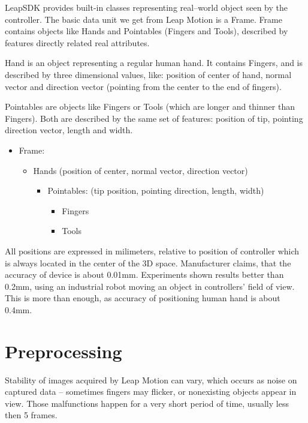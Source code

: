 LeapSDK provides built-in classes representing real--world object seen by the controller. The basic data unit we get from Leap Motion is a Frame. Frame contains objects like Hands and Pointables (Fingers and Tools), described by features directly related real attributes.

Hand is an object representing a regular human hand. It contains Fingers, and is described by three dimensional values, like: position of center of hand, normal vector and direction vector (pointing from the center to the end of fingers). 

Pointables are objects like Fingers or Tools (which are longer and thinner than Fingers). Both are described by the same set of features: position of tip, pointing direction vector, length and width.

\begin{itemize}
	\item Frame:
	\begin{itemize}
		\item Hands (position of center, normal vector, direction vector)
			\begin{itemize}
				\item Pointables: (tip position, pointing direction, length, width)
				\begin{itemize}
					\item Fingers
					\item Tools
				\end{itemize}
			\end{itemize}
	\end{itemize}
\end{itemize}

All positions are expressed in milimeters, relative to position of controller which is always located in the center of the 3D space. Manufacturer claims, that the accuracy of device is about 0.01mm. Experiments shown results better than 0.2mm, using an industrial robot moving an object in controllers' field of view. This is more than enough, as accuracy of positioning human hand is about 0.4mm.~\cite{lmAN} 

\section{Preprocessing} \label{PreprocessingSection}

Stability of images acquired by Leap Motion can vary, which occurs as noise on captured data -- sometimes fingers may flicker, or nonexisting objects appear in view. Those malfunctions happen for a very short period of time, usually less then 5 frames. 


